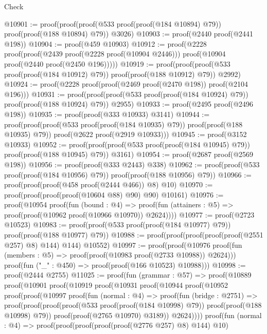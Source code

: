\begin{lexlean}{Check}
\begin{coremodule}
@10901 := proof(proof(proof(@533 proof(proof(@184 @10894) @79)) proof(proof(@188 @10894) @79))
      @3026)
@10903 := proof(@2440 proof(@2441 @198))
@10904 := proof(@459 @10903)
@10912 := proof(@2228
      proof(proof(@2439 proof(@2228 proof(@10904 @2446)))
          proof(@10904 proof(@2440 proof(@2450 @196)))))
@10919 := proof(proof(proof(@533 proof(proof(@184 @10912) @79)) proof(proof(@188 @10912) @79))
      @2992)
@10924 := proof(@2228 proof(proof(@2469 proof(@2470 @198)) proof(@2104 @196)))
@10931 := proof(proof(proof(@533 proof(proof(@184 @10924) @79)) proof(proof(@188 @10924) @79))
      @2955)
@10933 := proof(@2495 proof(@2496 @198))
@10935 := proof(proof(@333 @10933) @3141)
@10944 := proof(proof(proof(@533 proof(proof(@184 @10935) @79)) proof(proof(@188 @10935) @79))
      proof(@2622 proof(@2919 @10933)))
@10945 := proof(@3152 @10933)
@10952 := proof(proof(proof(@533 proof(proof(@184 @10945) @79)) proof(proof(@188 @10945) @79))
      @3161)
@10954 := proof(@2687 proof(@2569 @198))
@10956 := proof(proof(@333 @2443) @338)
@10962 := proof(proof(@533 proof(proof(@184 @10956) @79)) proof(proof(@188 @10956) @79))
@10966 := proof(proof(proof(@458 proof(@2444 @466)) @8) @10)
@10970 := proof(proof(proof(proof(@10604 @88) @90) @90) @10161)
@10976 := proof(@10954
      proof(fun (bound : @4) =>
        proof(fun (attainers : @5) => proof(proof(@10962 proof(@10966 @10970)) @2624))))
@10977 := proof(@2723 @10523)
@10983 := proof(proof(@533 proof(proof(@184 @10977) @79)) proof(proof(@188 @10977) @79))
@10988 := proof(proof(proof(proof(proof(@2551 @257) @8) @144) @144) @10552)
@10997 := proof(proof(@10976
        proof(fun (members : @5) => proof(proof(@10983 proof(@2733 @10988)) @2624)))
      proof(fun ("_" : @450) => proof(proof(@166 @10523) @10988)))
@10998 := proof(@2444 @2755)
@11025 := proof(fun (grammar : @57) =>
    proof(@10889
        proof(@10901
            proof(@10919
                proof(@10931
                    proof(@10944
                        proof(@10952
                            proof(proof(@10997
                                  proof(fun (normal : @4) =>
                                    proof(fun (bridge : @2751) =>
                                      proof(proof(proof(proof(@533 proof(proof(@184 @10998) @79))
                                              proof(proof(@188 @10998) @79))
                                            proof(proof(@2765 @10970) @3189))
                                          @2624))))
                                proof(fun (normal : @4) =>
                                  proof(proof(proof(proof(proof(@2776 @257) @8) @144) @10)

\end{coremodule}
\end{lexlean}
